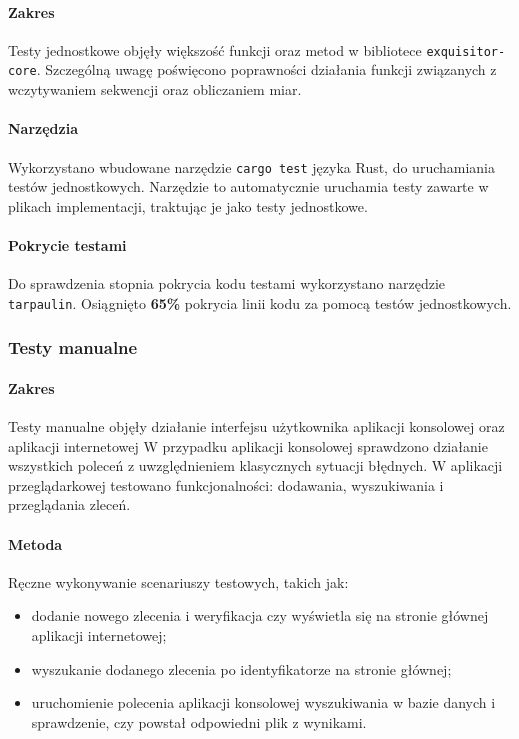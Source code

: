             \paragraph{Zakres}
            Testy jednostkowe objęły większość funkcji oraz metod w bibliotece \texttt{exquisitor-core}. Szczególną uwagę poświęcono poprawności działania funkcji związanych z wczytywaniem sekwencji oraz obliczaniem miar.

            \paragraph{Narzędzia}
            Wykorzystano wbudowane narzędzie \texttt{cargo test} języka Rust, do uruchamiania testów jednostkowych. Narzędzie to automatycznie uruchamia testy zawarte w plikach implementacji, traktując je jako testy jednostkowe.

            \paragraph{Pokrycie testami}
            Do sprawdzenia stopnia pokrycia kodu testami wykorzystano narzędzie \texttt{tarpaulin}\cite{Rust:tarpaulin}.
            Osiągnięto \textbf{65\%} pokrycia linii kodu za pomocą testów jednostkowych.

        \subsubsection{Testy manualne}

            \paragraph{Zakres}
            Testy manualne objęły działanie interfejsu użytkownika aplikacji konsolowej oraz aplikacji internetowej W przypadku aplikacji konsolowej sprawdzono działanie wszystkich poleceń z uwzględnieniem klasycznych sytuacji błędnych. W aplikacji przeglądarkowej testowano funkcjonalności: dodawania, wyszukiwania i przeglądania zleceń.


            \paragraph{Metoda}
            Ręczne wykonywanie scenariuszy testowych, takich jak:
            \begin{itemize}
                \item {dodanie nowego zlecenia i weryfikacja czy wyświetla się na stronie głównej aplikacji internetowej;}
                \item {wyszukanie dodanego zlecenia po identyfikatorze na stronie głównej;}
                \item {uruchomienie polecenia aplikacji konsolowej wyszukiwania w bazie danych i sprawdzenie, czy powstał odpowiedni plik z wynikami.}
            \end{itemize}
